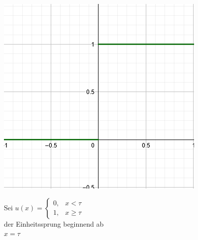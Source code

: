\documentclass[12pt,a4paper]{article}
\newcommand{\nl}{\\[0.1cm]}
\begin{document}
\begin{minipage}{\linewidth}
\centering
\begin{minipage}{0.45\linewidth}
\begin{figure}[H]
\includegraphics[width=0.9\linewidth]{./resources/einheitssprung_funktion.png}
\end{figure}
\end{minipage}
\hspace{0.05\linewidth}
\begin{minipage}{0.45\linewidth}
\begin{figure}[H]
Sei $u(x) = \displaystyle \begin{cases} 0, & x<\tau \\ 1, & x\geq \tau \end{cases}$\\
der Einheitssprung beginnend ab\\ $x = \tau$
\end{figure}
\end{minipage}
\end{minipage}
\nl
\end{document}
